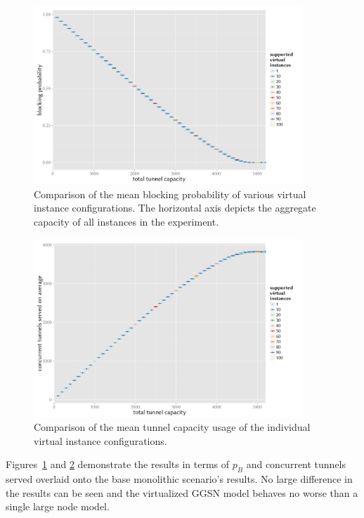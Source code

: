 \begin{figure}[htb]
	\centering
	\includegraphics[width=0.9\textwidth]{images/R-virtualized-blocking.pdf}
	\caption{Comparison of the mean blocking probability of various virtual instance configurations. The horizontal axis depicts the aggregate capacity of all instances in the experiment.}
\label{c4:fig:virtualized_blocking}
\end{figure}

\begin{figure}[htb]
	\centering
	\includegraphics[width=0.9\textwidth]{images/R-virtualized-tunnelusage.pdf}
	\caption{Comparison of the mean tunnel capacity usage of the individual virtual instance configurations.}
\label{c4:fig:virtualized_tunnelusage}
\end{figure}

Figures~\ref{c4:fig:virtualized_blocking} and \ref{c4:fig:virtualized_tunnelusage} demonstrate the results in terms of $p_B$ and concurrent tunnels served overlaid onto the base monolithic scenario's results. No large difference in the results can be seen and the virtualized \gls{GGSN} model behaves no worse than a single large node model.

